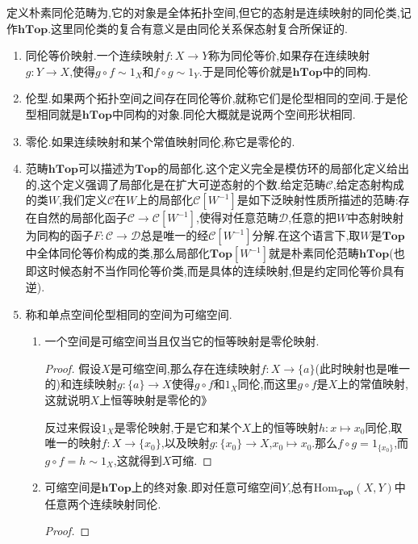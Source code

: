 定义朴素同伦范畴为,它的对象是全体拓扑空间,但它的态射是连续映射的同伦类,记作$\textbf{hTop}$.这里同伦类的复合有意义是由同伦关系保态射复合所保证的.
\begin{enumerate}
	\item 同伦等价映射.一个连续映射$f:X\to Y$称为同伦等价,如果存在连续映射$g:Y\to X$,使得$g\circ f\sim 1_X$和$f\circ g\sim 1_Y$.于是同伦等价就是$\textbf{hTop}$中的同构.
	\item 伦型.如果两个拓扑空间之间存在同伦等价,就称它们是伦型相同的空间.于是伦型相同就是$\textbf{hTop}$中同构的对象.同伦大概就是说两个空间形状相同.
	\item 零伦.如果连续映射和某个常值映射同伦,称它是零伦的.
	\item 范畴$\textbf{hTop}$可以描述为$\textbf{Top}$的局部化.这个定义完全是模仿环的局部化定义给出的,这个定义强调了局部化是在扩大可逆态射的个数.给定范畴$\mathscr{C}$,给定态射构成的类$W$,我们定义$\mathscr{C}$在$W$上的局部化$\mathscr{C}[W^{-1}]$是如下泛映射性质所描述的范畴:存在自然的局部化函子$\mathscr{C}\to\mathscr{C}[W^{-1}]$,使得对任意范畴$\mathscr{D}$,任意的把$W$中态射映射为同构的函子$F:\mathscr{C}\to\mathscr{D}$总是唯一的经$\mathscr{C}[W^{-1}]$分解.在这个语言下,取$W$是$\textbf{Top}$中全体同伦等价构成的类,那么局部化$\textbf{Top}[W^{-1}]$就是朴素同伦范畴$\textbf{hTop}$(也即这时候态射不当作同伦等价类,而是具体的连续映射,但是约定同伦等价具有逆).
	\item 称和单点空间伦型相同的空间为可缩空间.
	\begin{enumerate}
		\item 一个空间是可缩空间当且仅当它的恒等映射是零伦映射.
		\begin{proof}
			
			假设$X$是可缩空间,那么存在连续映射$f:X\to\{a\}$(此时映射也是唯一的)和连续映射$g:\{a\}\to X$使得$g\circ f$和$1_X$同伦,而这里$g\circ f$是$X$上的常值映射,这就说明$X$上恒等映射是零伦的》
			
			反过来假设$1_X$是零伦映射,于是它和某个$X$上的恒等映射$h:x\mapsto x_0$同伦,取唯一的映射$f:X\to\{x_0\}$,以及映射$g:\{x_0\}\to X$,$x_0\mapsto x_0$.那么$f\circ g=1_{\{x_0\}}$,而$g\circ f=h\sim 1_X$,这就得到$X$可缩.
		\end{proof}
		\item 可缩空间是$\textbf{hTop}$上的终对象.即对任意可缩空间$Y$,总有$\mathrm{Hom}_{\textbf{Top}}(X,Y)$中任意两个连续映射同伦.
		\begin{proof}
			

\end{proof}
\end{enumerate}
\end{enumerate}
